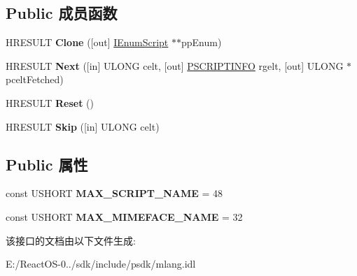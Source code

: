 \subsection*{Public 成员函数}
\begin{DoxyCompactItemize}
\item 
\mbox{\label{interface_multi_language_1_1_i_enum_script_a1b6801569b7701bd5e5b060e1150a14f}} 
H\+R\+E\+S\+U\+LT {\bfseries Clone} (\mbox{[}out\mbox{]} \hyperlink{interface_multi_language_1_1_i_enum_script}{I\+Enum\+Script} $\ast$$\ast$pp\+Enum)
\item 
\mbox{\label{interface_multi_language_1_1_i_enum_script_a70816d001c0d1e6df2ff7e466f7d041b}} 
H\+R\+E\+S\+U\+LT {\bfseries Next} (\mbox{[}in\mbox{]} U\+L\+O\+NG celt, \mbox{[}out\mbox{]} \hyperlink{struct_multi_language_1_1_i_enum_script_1_1tag_s_c_r_i_p_t_i_n_f_o}{P\+S\+C\+R\+I\+P\+T\+I\+N\+FO} rgelt, \mbox{[}out\mbox{]} U\+L\+O\+NG $\ast$pcelt\+Fetched)
\item 
\mbox{\label{interface_multi_language_1_1_i_enum_script_a3f5a801bca30cb67b2886143b0a4672a}} 
H\+R\+E\+S\+U\+LT {\bfseries Reset} ()
\item 
\mbox{\label{interface_multi_language_1_1_i_enum_script_ae5800ac4c96ecd3033adfff173f6fbda}} 
H\+R\+E\+S\+U\+LT {\bfseries Skip} (\mbox{[}in\mbox{]} U\+L\+O\+NG celt)
\end{DoxyCompactItemize}
\subsection*{Public 属性}
\begin{DoxyCompactItemize}
\item 
\mbox{\label{interface_multi_language_1_1_i_enum_script_aeff2920ba850fab2487567dd737c2f1a}} 
const U\+S\+H\+O\+RT {\bfseries M\+A\+X\+\_\+\+S\+C\+R\+I\+P\+T\+\_\+\+N\+A\+ME} = 48
\item 
\mbox{\label{interface_multi_language_1_1_i_enum_script_a73b68e07900e1015b60da9dc63f486f5}} 
const U\+S\+H\+O\+RT {\bfseries M\+A\+X\+\_\+\+M\+I\+M\+E\+F\+A\+C\+E\+\_\+\+N\+A\+ME} = 32
\end{DoxyCompactItemize}


该接口的文档由以下文件生成\+:\begin{DoxyCompactItemize}
\item 
E\+:/\+React\+O\+S-\/0../sdk/include/psdk/mlang.\+idl\end{DoxyCompactItemize}
